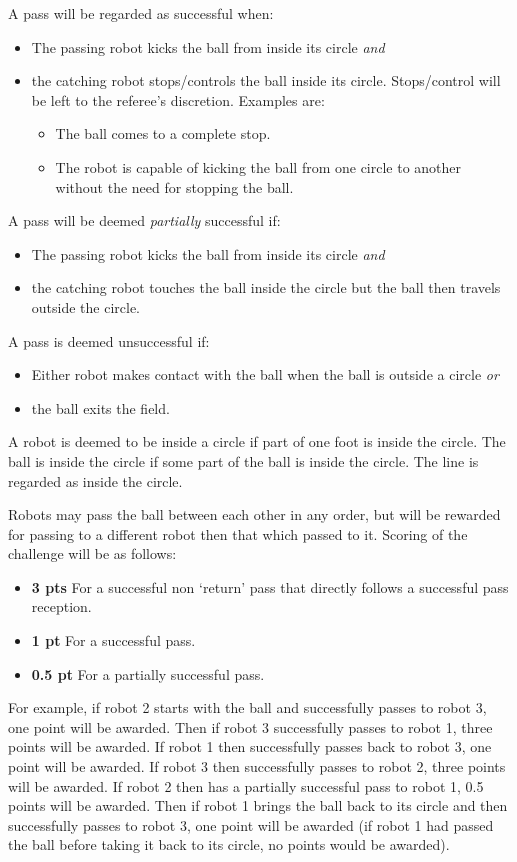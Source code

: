 \documentclass{article}
\begin{document}
A pass will be regarded as successful when:
\begin{itemize}
\item The passing robot kicks the ball from inside its circle \emph{and}
\item the catching robot stops/controls the ball inside its circle. Stops/control will be
left to the referee's discretion. Examples are:
\begin{itemize}
\item The ball comes to a complete stop.
\item The robot is capable of kicking the ball from one circle to another without the need for stopping the ball.
\end{itemize}
\end{itemize}

A pass will be deemed \emph{partially} successful if:
\begin{itemize}
\item The passing robot kicks the ball from inside its circle \emph{and}
\item the catching robot touches the ball inside the circle but the ball then travels outside the circle.
\end{itemize}

A pass is deemed unsuccessful if:
\begin{itemize}
\item Either robot makes contact with the ball when the ball is outside a circle \emph{or}
\item the ball exits the field.
\end{itemize}

A robot is deemed to be inside a circle if part of one foot is inside the circle. The ball is
inside the circle if some part of the ball is inside the circle. The line is regarded as inside the circle.

Robots may pass the ball between each other in any order, but will be rewarded for passing
to a different robot then that which passed to it. Scoring of the challenge will be as
follows:
\begin{itemize}
\item \textbf{3 pts} For a successful non `return' pass that directly follows a successful pass reception.
\item \textbf{1 pt} For a successful pass.
\item \textbf{0.5 pt} For a partially successful pass.
\end{itemize}

For example, if robot 2 starts with the ball and successfully passes to robot 3, one point will be awarded.  Then if robot 3 successfully passes to robot 1, three points will be awarded.  If robot 1 then successfully passes back to robot 3, one point will be awarded.  If robot 3 then successfully passes to robot 2, three points will be awarded.  If robot 2 then has a partially successful pass to robot 1, 0.5 points will be awarded.  Then if robot 1 brings the ball back to its circle and then successfully passes to robot 3, one point will be awarded (if robot 1 had passed the ball before taking it back to its circle, no points would be awarded).
\end{document}
